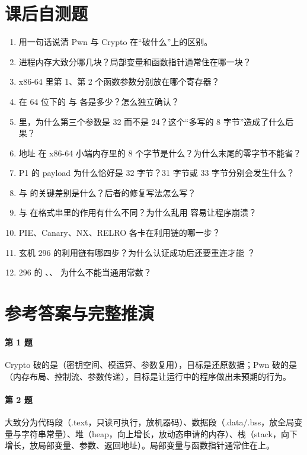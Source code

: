 \documentclass[UTF8,12pt,oneside]{ctexbook}
\begin{document}
\section{课后自测题}
\begin{enumerate}
\item 用一句话说清 Pwn 与 Crypto 在“破什么”上的区别。
\item 进程内存大致分哪几块？局部变量和函数指针通常住在哪一块？
\item x86-64 里第 1、第 2 个函数参数分别放在哪个寄存器？
\item {} 在 64 位下的  与  各是多少？怎么独立确认？
\item {} 里，为什么第三个参数是 32 而不是 24？这个“多写的 8 字节”造成了什么后果？
\item 地址  在 x86-64 小端内存里的 8 个字节是什么？为什么末尾的零字节不能省？
\item P1 的 payload 为什么恰好是 32 字节？31 字节或 33 字节分别会发生什么？
\item {} 与  的关键差别是什么？后者的修复写法怎么写？
\item {} 与  在格式串里的作用有什么不同？为什么乱用  容易让程序崩溃？
\item PIE、Canary、NX、RELRO 各卡在利用链的哪一步？
\item 玄机 296 的利用链有哪四步？为什么认证成功后还要重连才能 ？
\item 296 的 、、 为什么不能当通用常数？
\end{enumerate}

\section{参考答案与完整推演}

\paragraph{第 1 题}Crypto 破的是（密钥空间、模运算、参数复用），目标是还原数据；Pwn 破的是（内存布局、控制流、参数传递），目标是让运行中的程序做出未预期的行为。

\paragraph{第 2 题}大致分为代码段（.text，只读可执行，放机器码）、数据段（.data/.bss，放全局变量与字符串常量）、堆（heap，向上增长，放动态申请的内存）、栈（stack，向下增长，放局部变量、参数、返回地址）。局部变量与函数指针通常住在上。
\end{document}
